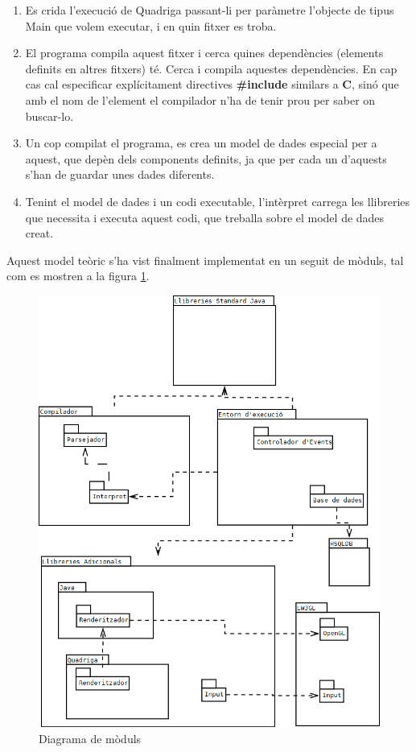   \begin{enumerate}
    \item Es crida l'execució de Quadriga passant-li per paràmetre l'objecte de tipus Main que volem executar, i en quin fitxer es troba.
    \item El programa compila aquest fitxer i cerca quines dependències (elements definits en altres fitxers) té. Cerca i compila aquestes dependències. En cap cas cal especificar explícitament directives {\bf \#{}include} similars a {\bf C}, sinó que amb el nom de l'element el compilador n'ha de tenir prou per saber on buscar-lo.
    \item Un cop compilat el programa, es crea un model de dades especial per a aquest, que depèn dels components definits, ja que per cada un d'aquests s'han de guardar unes dades diferents.
    \item Tenint el model de dades i un codi executable, l'intèrpret carrega les llibreries que necessita i executa aquest codi, que treballa sobre el model de dades creat.
  \end{enumerate}

  Aquest model teòric s'ha vist finalment implementat en un seguit de mòduls, tal com es mostren a la figura  \ref{fig:DiagramaDeModuls}.

  \begin{figure}
    \includegraphics[width=1\linewidth]{./img/Moduls.png}
    \caption{Diagrama de mòduls \label{fig:DiagramaDeModuls}}
  \end{figure}
  
